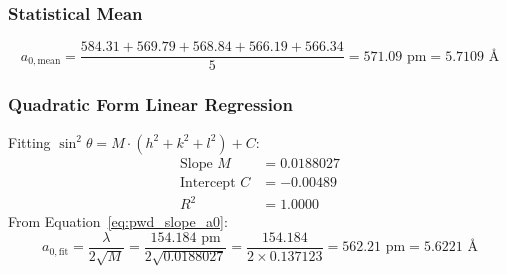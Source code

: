 \documentclass[12pt,a4paper]{article}
\begin{document}
\subsubsection{Statistical Mean}
\begin{equation}
    a_{0,\text{mean}} = \frac{584.31 + 569.79 + 568.84 + 566.19 + 566.34}{5} = 571.09\text{ pm} = 5.7109\text{ \AA}
\end{equation}

\subsubsection{Quadratic Form Linear Regression}
Fitting $\sin^2\theta = M \cdot (h^2 + k^2 + l^2) + C$:
\begin{align}
    \text{Slope } M &= 0.0188027 \\
    \text{Intercept } C &= -0.00489 \\
    R^2 &= 1.0000
\end{align}
From Equation~\eqref{eq:pwd_slope_a0}:
\begin{equation}
    a_{0,\text{fit}} = \frac{\lambda}{2\sqrt{M}} = \frac{154.184\text{ pm}}{2\sqrt{0.0188027}} = \frac{154.184}{2 \times 0.137123} = 562.21\text{ pm} = 5.6221\text{ \AA}
\end{equation}

\newpage
\end{document}
